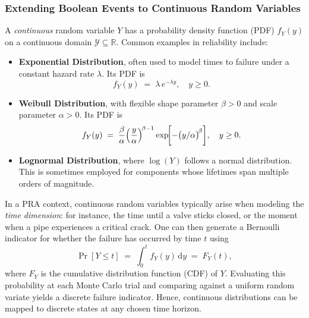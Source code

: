 \subsubsection{Extending Boolean Events to Continuous Random Variables}
A \emph{continuous} random variable \(Y\) has a probability density function (PDF) \(f_Y(y)\) on a continuous domain \(\mathcal{Y}\subseteq \mathbb{R}\). Common examples in reliability include:
\begin{itemize}
\item \textbf{Exponential Distribution}, often used to model times to failure under a constant hazard rate \(\lambda\). Its PDF is
\[
f_Y(y) \;=\; \lambda\, e^{-\lambda y},
\quad
y \ge 0.
\]
\item \textbf{Weibull Distribution}, with flexible shape parameter \(\beta>0\) and scale parameter \(\alpha>0\). Its PDF is
\[
f_Y(y)
\;=\;
\frac{\beta}{\alpha}
\Bigl(\frac{y}{\alpha}\Bigr)^{\!\beta -1}
\exp\!\biggl[-\bigl(y/\alpha\bigr)^{\!\beta}\biggr],
\quad
y\ge 0.
\]
\item \textbf{Lognormal Distribution}, where \(\log(Y)\) follows a normal distribution. This is sometimes employed for components whose lifetimes span multiple orders of magnitude.
\end{itemize}
In a PRA context, continuous random variables typically arise when modeling the \emph{time dimension}: for instance, the time until a valve sticks closed, or the moment when a pipe experiences a critical crack. One can then generate a Bernoulli indicator for whether the failure has occurred by time \(t\) using
\[
\Pr[Y \le t]
\;=\;
\int_{0}^{t} f_Y(y)\,\mathrm{d}y
\;=\;
F_Y(t),
\]
where \(F_Y\) is the cumulative distribution function (CDF) of \(Y\). Evaluating this probability at each Monte Carlo trial and comparing against a uniform random variate yields a discrete failure indicator. Hence, continuous distributions can be mapped to discrete states at any chosen time horizon.




